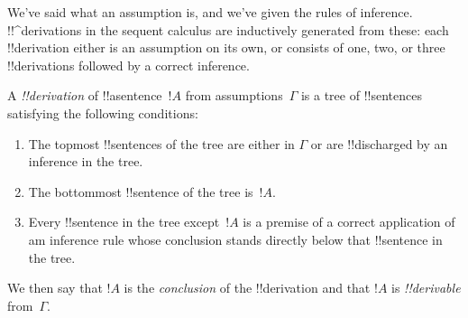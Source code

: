 \documentclass[../../../include/open-logic-section]{subfiles}
\begin{document}


\begin{explain}
We've said what an assumption is, and we've given the rules of
inference.  !!^{derivation}s in the sequent calculus are inductively
generated from these: each !!{derivation} either is an assumption
on its own, or consists of one, two, or three !!{derivation}s followed
by a correct inference.
\end{explain}

\begin{defn}[!!^{derivation}]
A \emph{!!{derivation}} of !!a{sentence}~$!A$ from assumptions~$\Gamma$
is a tree of !!{sentence}s satisfying the following conditions:
\begin{enumerate}
\item The topmost !!{sentence}s of the tree are either in $\Gamma$ or
  are !!{discharged} by an inference in the tree.
\item The bottommost !!{sentence} of the tree is~$!A$.
\item Every !!{sentence} in the tree except~$!A$ is a premise of a correct
  application of am inference rule whose conclusion stands directly
  below that !!{sentence} in the tree.
\end{enumerate}
We then say that $!A$ is the \emph{conclusion} of the
!!{derivation} and that $!A$ is \emph{!!{derivable}} from~$\Gamma$.
\end{defn}
\end{document}

